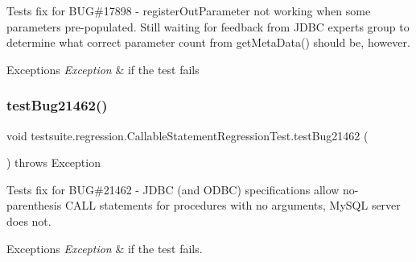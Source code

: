Tests fix for B\+UG\#17898 -\/ register\+Out\+Parameter not working when some parameters pre-\/populated. Still waiting for feedback from J\+D\+BC experts group to determine what correct parameter count from get\+Meta\+Data() should be, however.


\begin{DoxyExceptions}{Exceptions}
{\em Exception} & if the test fails \\
\hline
\end{DoxyExceptions}
\mbox{\label{classtestsuite_1_1regression_1_1_callable_statement_regression_test_abb265c7a921933c8ecde8c1c12441513}} 
\subsubsection{\texorpdfstring{test\+Bug21462()}{testBug21462()}}
{\footnotesize\ttfamily void testsuite.\+regression.\+Callable\+Statement\+Regression\+Test.\+test\+Bug21462 (\begin{DoxyParamCaption}{ }\end{DoxyParamCaption}) throws Exception}

Tests fix for B\+UG\#21462 -\/ J\+D\+BC (and O\+D\+BC) specifications allow no-\/parenthesis C\+A\+LL statements for procedures with no arguments, My\+S\+QL server does not.


\begin{DoxyExceptions}{Exceptions}
{\em Exception} & if the test fails. \\
\hline
\end{DoxyExceptions}
\mbox{\label{classtestsuite_1_1regression_1_1_callable_statement_regression_test_a32068ab38e449a082792fc6fcd779fb3}} 
